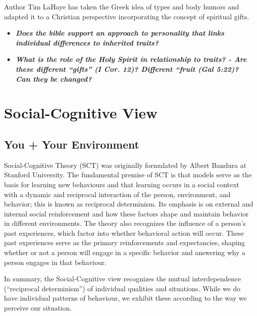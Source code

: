 \documentclass[
]{book}
\providecommand{\tightlist}{%
  \setlength{\itemsep}{0pt}\setlength{\parskip}{0pt}}
\begin{document}
\begin{reflect}
Author Tim LaHaye has taken the Greek idea of types and body humors and adapted it to a Christian perspective incorporating the concept of spiritual gifts.

\begin{itemize}
\tightlist
\item
  \textbf{\emph{Does the bible support an approach to personality that links individual differences to inherited traits?}}\\
\item
  \textbf{\emph{What is the role of the Holy Spirit in relationship to traits? - Are these different ``gifts'' (I Cor. 12)? Different ``fruit (Gal 5:22)? Can they be changed?}}
\end{itemize}
\end{reflect}

\hypertarget{social-cognitive-view}{%
\section{Social-Cognitive View}\label{social-cognitive-view}}

\hypertarget{you-your-environment}{%
\subsection*{You + Your Environment}\label{you-your-environment}}

Social-Cognitive Theory (SCT) was originally formulated by Albert Bandura at Stanford University. The fundamental premise of SCT is that models serve as the basis for learning new behaviours and that learning occurs in a social context with a dynamic and reciprocal interaction of the person, environment, and behavior; this is known as reciprocal determinism. Its emphasis is on external and internal social reinforcement and how these factors shape and maintain behavior in different environments. The theory also recognizes the influence of a person's past experiences, which factor into whether behavioral action will occur. These past experiences serve as the primary reinforcements and expectancies, shaping whether or not a person will engage in a specific behavior and answering why a person engages in that behaviour.

In summary, the Social-Cognitive view recognizes the mutual interdependence (``reciprocal determinism'') of individual qualities and situations. While we do have individual patterns of behaviour, we exhibit these according to the way we perceive our situation.
\end{document}
